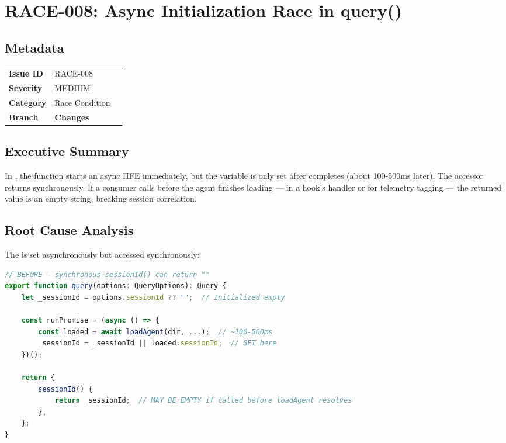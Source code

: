 \section{RACE-008: Async Initialization Race in query()}
\label{sec:race-008}
\subsection*{Metadata}
\begin{tabular}{ll}
\textbf{Issue ID} & RACE-008 \\
\textbf{Severity} & MEDIUM \\
\textbf{Category} & Race Condition \\
\textbf{Branch} & 
\textbf{Changes} &  \\
\end{tabular}

\subsection*{Executive Summary}
In , the  function starts an async IIFE immediately, but the  variable is only set after  completes (about 100-500ms later). The  accessor returns  synchronously. If a consumer calls  before the agent finishes loading — in a hook's  handler or for telemetry tagging — the returned value is an empty string, breaking session correlation.

\subsection*{Root Cause Analysis}
The  is set asynchronously but accessed synchronously:

\begin{lstlisting}[language=TypeScript]
// BEFORE — synchronous sessionId() can return ""
export function query(options: QueryOptions): Query {
    let _sessionId = options.sessionId ?? "";  // Initialized empty

    const runPromise = (async () => {
        const loaded = await loadAgent(dir, ...);  // ~100-500ms
        _sessionId = _sessionId || loaded.sessionId;  // SET here
    })();

    return {
        sessionId() {
            return _sessionId;  // MAY BE EMPTY if called before loadAgent resolves
        },
    };
}
\end{lstlisting}

